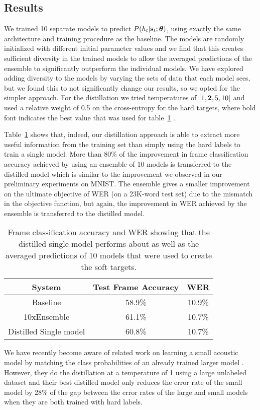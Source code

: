 \subsection{Results}

We trained 10 separate models to predict $P(h_t | \mathbf{s}_t;\boldsymbol{\theta})$, using exactly the same architecture and training
procedure as the baseline. The models are randomly initialized with different initial parameter values and we find that
this creates sufficient diversity in the trained models to allow the averaged predictions of the ensemble to
significantly outperform the individual models.  We have explored adding diversity to the models by varying the sets of
data that each model sees, but we found this to not significantly change our results, so we opted for the simpler
approach. For the distillation we tried temperatures of $[1, {\bf 2}, 5, 10]$ and used a relative weight of 0.5 on the
cross-entropy for the hard targets, where bold font indicates the best value that was used for
table~\ref{tab:speech_results} .

Table~\ref{tab:speech_results} shows that, indeed, our distillation approach is able to extract more useful information
from the training set than simply using the hard labels to train a single model. More than 80\% of the improvement in
frame classification accuracy achieved by using an ensemble of 10 models is transferred to the distilled model which is
similar to the improvement we observed in our preliminary experiments on MNIST. The ensemble gives a smaller improvement
on the ultimate objective of WER (on a 23K-word test set) due to the mismatch in the objective function, but again, the
improvement in WER achieved by the ensemble is transferred to the distilled model.  

\begin{table}
\small
\centering
\begin{tabular}{|c|c|c|}
\hline
System & Test Frame Accuracy & WER \\
\hline
Baseline & 58.9\% & 10.9\%\\
10xEnsemble & 61.1\%& 10.7\% \\
Distilled Single model & 60.8\%& 10.7\%\\
\hline
\end{tabular}
\caption{Frame classification accuracy and WER showing that the distilled single model performs about as well as the
  averaged predictions of  10  models that were used to create the soft targets.}\label{tab:speech_results}
\end{table}

We have recently become aware of related work on learning a small acoustic model by matching the class probabilities of
an already trained larger model \cite{LiZhaoHuangGong}. However, they do the distillation at a temperature of 1 using a
large unlabeled dataset and their best distilled model only reduces the error rate of the small model by 28\% of the
gap between the error rates of the large and small models when they are both trained with hard labels.
